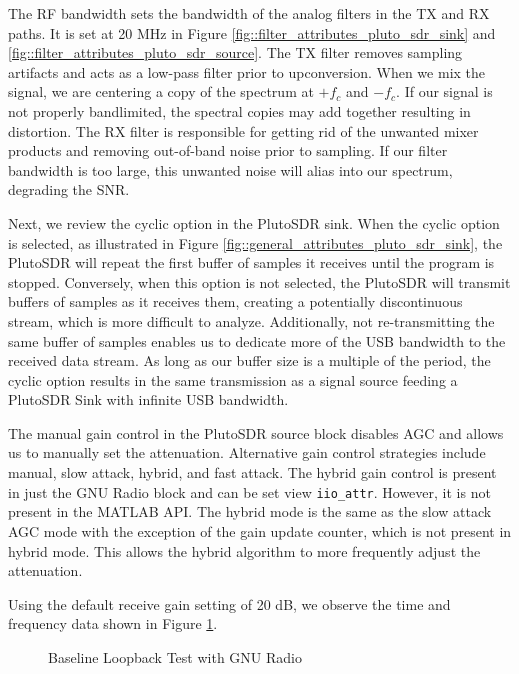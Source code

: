 \documentclass{article}
\begin{document}
The RF bandwidth sets the bandwidth of the analog filters in the TX and RX paths. It is set at 20 MHz in Figure \ref{fig::filter_attributes_pluto_sdr_sink} and \ref{fig::filter_attributes_pluto_sdr_source}. The TX filter removes sampling artifacts and acts as a low-pass filter prior to upconversion. When we mix the signal, we are centering a copy of the spectrum at $+f_c$ and $-f_c$. If our signal is not properly bandlimited, the spectral copies may add together resulting in distortion. The RX filter is responsible for getting rid of the unwanted mixer products and removing out-of-band noise prior to sampling. If our filter bandwidth is too large, this unwanted noise will alias into our spectrum, degrading the SNR. 

Next, we review the cyclic option in the PlutoSDR sink. When the cyclic option is selected, as illustrated in Figure \ref{fig::general_attributes_pluto_sdr_sink}, the PlutoSDR will repeat the first buffer of samples it receives until the program is stopped. Conversely, when this option is not selected, the PlutoSDR will transmit buffers of samples as it receives them, creating a potentially discontinuous stream, which is more difficult to analyze. Additionally, not re-transmitting the same buffer of samples enables us to dedicate more of the USB bandwidth to the received data stream. As long as our buffer size is a multiple of the period, the cyclic option results in the same transmission as a signal source feeding a PlutoSDR Sink with infinite USB bandwidth.

The manual gain control in the PlutoSDR source block disables AGC and allows us to manually set the attenuation. Alternative gain control strategies include manual, slow attack, hybrid, and fast attack. The hybrid gain control is present in just the GNU Radio block and can be set view \texttt{iio\_attr}. However, it is not present in the MATLAB API. The hybrid mode is the same as the slow attack AGC mode with the exception of the gain update counter, which is not present in hybrid mode. This allows the hybrid algorithm to more frequently adjust the attenuation.

Using the default receive gain setting of 20 dB, we observe the time and frequency data shown in Figure \ref{fig::gnu_radio_loopback_baseline}.

\begin{figure}[H]
	\centerline{}
	\caption{Baseline Loopback Test with GNU Radio}
	\label{fig::gnu_radio_loopback_baseline}
\end{figure}
\end{document}
